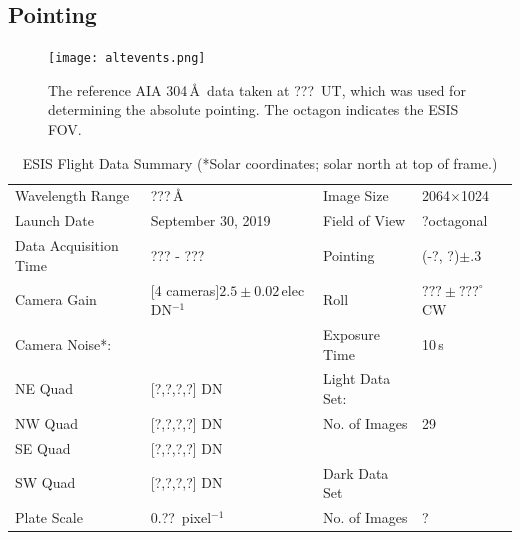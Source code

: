 	\subsection{Pointing} \label{sec:point}
		
		\begin{figure}[h!]
			\begin{center}
				\texttt{[image: altevents.png]}
				\caption{The reference AIA 304\,\AA\ data taken at ???~UT, which was used for determining the absolute pointing. The octagon indicates the ESIS FOV.}
				\label{fig:fov}
			\end{center}
		\end{figure}
	
		\begin{center}
			\begin{table}
				\caption{ESIS Flight Data Summary (*Solar coordinates; solar north at top of frame.)}
				\label{tab:data_info}
				\begin{tabular}{ll | l l}\hline
					Wavelength Range &   ???\,\AA\  & Image Size  & 2064$\times$1024\\
					Launch Date & September 30, 2019 & Field of View  & ?\arcmin octagonal \\
					Data Acquisition Time & ??? - ??? & Pointing  & (-?\arcsec, ?\arcsec)$\pm .3$\arcsec  \\
					Camera Gain &   [4 cameras]$2.5 \pm 0.02$\,elec DN$^{-1}$ & Roll & $??? \pm ???^\circ$ CW \\
					Camera Noise*: & & Exposure Time & 10\,s\\
					\hspace{0.2in}NE Quad & [?,?,?,?] DN & Light Data Set: &\\
					\hspace{0.2in}NW Quad & [?,?,?,?] DN & \hspace{0.2in}No. of Images & 29\\
					\hspace{0.2in}SE Quad  & [?,?,?,?] DN & &\\
					\hspace{0.2in}SW Quad  & [?,?,?,?] DN & Dark Data Set & \\
					Plate Scale  & 0.??\arcsec\ pixel$^{-1}$ &  \hspace{0.2in}No. of Images & ? \\
					\hline
				\end{tabular}
			\end{table}
		\end{center}
		

